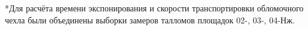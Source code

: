 \begin{table}[H]
\begin{center}
\begin{tabular}{ccccccc}
                          \bottomrule
 \end{tabular}
\end{center}
*Для расчёта времени экспонирования и скорости транспортировки обломочного чехла были объединены выборки замеров талломов площадок 02-, 03-, 04-Нж.

 \end{table}
